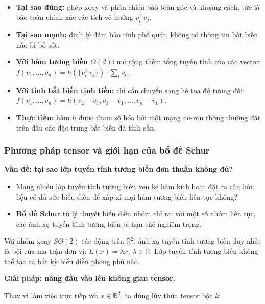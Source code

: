 \begin{itemize}
    \item \textbf{Tại sao đúng:} phép xoay và phản chiếu bảo toàn góc và khoảng cách, tức là bảo toàn chính xác các tích vô hướng $v_i^\top v_j$.
    \item \textbf{Tại sao mạnh:} định lý đảm bảo tính phổ quát, không có thông tin bất biến nào bị bỏ sót.
    \item \textbf{Với hàm tương biến $O(d)$:} mở rộng thêm tổng tuyến tính của các vector: $f(v_1,\ldots,v_n) = h(\{v_i^\top v_j\}) \cdot \sum_t v_t$.
    \item \textbf{Với tính bất biến tịnh tiến:} chỉ cần chuyển sang hệ tọa độ tương đối: $f(v_1,\ldots,v_n) = h(v_2{-}v_1, v_3{-}v_1, \ldots, v_n{-}v_1)$.
    \item \textbf{Thực tiễn:} hàm $h$ được tham số hóa bởi một mạng nơ-ron thông thường đặt trên đầu các đặc trưng bất biến đã tính sẵn.
\end{itemize}


\subsubsection{Phương pháp tensor và giới hạn của bổ đề Schur}
\label{subsubsec:tensor-methods}

\textbf{Vấn đề: tại sao lớp tuyến tính tương biến đơn thuần không đủ?}

\begin{itemize}
    \item Mạng nhiều lớp tuyến tính tương biến xen kẽ hàm kích hoạt đặt ra câu hỏi: liệu có đủ sức biểu diễn để xấp xỉ mọi hàm tương biến liên tục không?
    \item \textbf{Bổ đề Schur} từ lý thuyết biểu diễn nhóm chỉ ra: với một số nhóm liên tục, các ánh xạ tuyến tính tương biến bị hạn chế nghiêm trọng.
\end{itemize}

\begin{example}
Với nhóm xoay $SO(2)$ tác động trên $\mathbb{R}^2$, ánh xạ tuyến tính tương biến duy nhất là bội của ma trận đơn vị: $L(x) = \lambda x$, $\lambda \in \mathbb{R}$. Lớp tuyến tính tương biến không thể tạo ra bất kỳ biểu diễn phong phú nào.
\end{example}

\textbf{Giải pháp: nâng đầu vào lên không gian tensor.}

Thay vì làm việc trực tiếp với $x \in \mathbb{R}^d$, ta dùng lũy thừa tensor bậc $k$:

